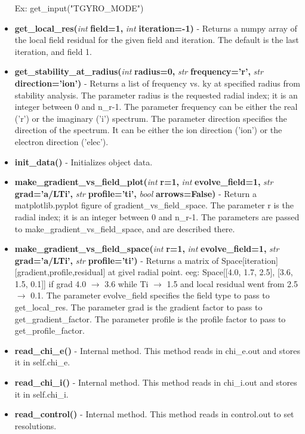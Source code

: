\documentclass{article}
\begin{document}
\begin{itemize}
Ex: get\_input("TGYRO\_MODE")
\item \textbf{get\_local\_res(}\emph{int}\textbf{ field=1,}\emph{ int}\textbf{ iteration=-1)} - Returns a numpy array of the local field residual for the given field and iteration.  The default is the last iteration, and field 1.
\item \textbf{get\_stability\_at\_radius(}\emph{int}\textbf{ radius=0,}\emph{ str}\textbf{ frequency='r',}\emph{ str}\textbf{ direction='ion')} - Returns a list of frequency vs. ky at specified radius from stability analysis.  The parameter radius is the requested radial index; it is an integer between 0 and n\_r-1.  The parameter frequency can be either the real ('r') or the imaginary ('i') spectrum.  The parameter direction specifies the direction of the spectrum.  It can be either the ion direction ('ion') or the electron direction ('elec').
\item \textbf{init\_data()} - Initializes object data.
\item \textbf{make\_gradient\_vs\_field\_plot(}\emph{int}\textbf{ r=1,}\emph{ int}\textbf{ evolve\_field=1,}\emph{ str}\textbf{ grad='a/LTi',}\emph{ str}\textbf{ profile='ti',}\emph{ bool}\textbf{ arrows=False)} - Return a matplotlib.pyplot figure of gradient\_vs\_field\_space.  The parameter r is the radial index; it is an integer between 0 and n\_r-1.  The parameters are passed to make\_gradient\_vs\_field\_space, and are described there.
\item \textbf{make\_gradient\_vs\_field\_space(}\emph{int}\textbf{ r=1,}\emph{ int}\textbf{ evolve\_field=1,}\emph{ str}\textbf{ grad='a/LTi',}\emph{ str}\textbf{ profile='ti')} - Returns a matrix of Space[iteration][gradient,profile,residual] at givel radial point.  eeg: Space[[4.0, 1.7, 2.5], [3.6, 1.5, 0.1]] if grad 4.0 $\rightarrow$ 3.6 while Ti $\rightarrow$ 1.5 and local residual went from 2.5 $\rightarrow$ 0.1.  The parameter evolve\_field specifies the field type to pass to get\_local\_res.  The parameter grad is the gradient factor to pass to get\_gradient\_factor.  The parameter profile is the profile factor to pass to get\_profile\_factor.
\item \textbf{read\_chi\_e()} - Internal method.  This method reads in chi\_e.out and stores it in self.chi\_e.
\item \textbf{read\_chi\_i()} - Internal method.  This method reads in chi\_i.out and stores it in self.chi\_i.
\item \textbf{read\_control()} - Internal method.  This method reads in control.out to set resolutions.

\end{itemize}
\end{document}
